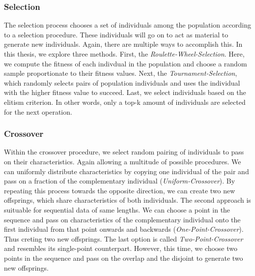\documentclass[./../../paper.tex]{subfiles}
\begin{document}
\subsubsection{Selection}
The selection process chooses a set of individuals among the population according to a selection procedure. These individuals will go on to act as material to generate new individuals. Again, there are multiple ways to accomplish this. In this thesis, we explore three methods. First, the \emph{Roulette-Wheel-Selection}. Here, we compute the fitness of each indivdual in the population and choose a random sample proportionate to their fitness values. Next, the \emph{Tournament-Selection}, which randomly selects pairs of population individuals and uses the individual with the higher fitness value to succeed. Last, we select individuals based on the elitism criterion. In other words, only a top-k amount of individuals are selected for the next operation.

\subsubsection{Crossover}
Within the crossover procedure, we select random pairing of individuals to pass on their characteristics. Again allowing a multitude of possible procedures. We can uniformly distribute characteristics by copying one individual of the pair and pass on a fraction of the complementary individual (\emph{Uniform-Crossover}). By repeating this process towards the opposite direction, we can create two new offsprings, which share characteristics of both individuals. The second approach is suituable for sequential data of same lengths. We can choose a point in the sequence and pass on characteristics of the complementary individual onto the first individual from that point onwards and backwards (\emph{One-Point-Crossover}). Thus creting two new offsprings. The last option is called \emph{Two-Point-Crossover} and resembles its single-point counterpart. However, this time, we choose two points in the sequence and pass on the overlap and the disjoint to generate two new offsprings.

\end{document}
